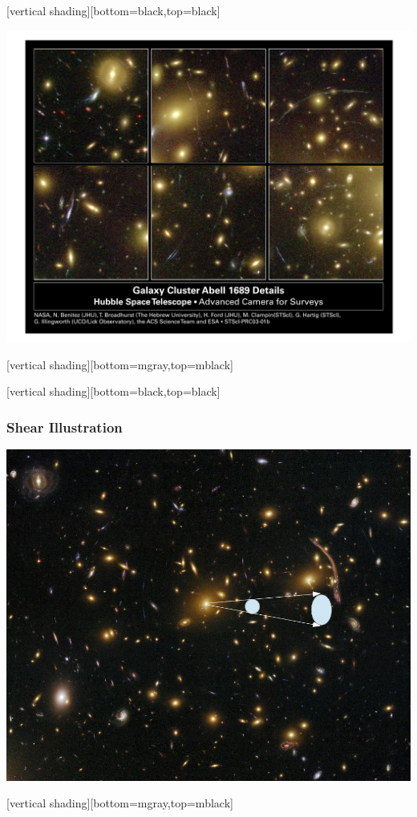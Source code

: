 \documentclass{beamer}
\begin{document}
{
    [vertical shading][bottom=black,top=black]
	
    \frame
    {
        \begin{center}
            \includegraphics[height=0.9\textheight]{abell1689-details.pdf}
        \end{center}
    }

    [vertical shading][bottom=mgray,top=mblack]

}

{
    [vertical shading][bottom=black,top=black]
	
    \frame
    {
        \frametitle{Shear Illustration}
        \begin{center}
            \includegraphics[height=0.8\textheight]{shear-illustration-nowhite.jpg}
        \end{center}
    }

    [vertical shading][bottom=mgray,top=mblack]

}
\end{document}
